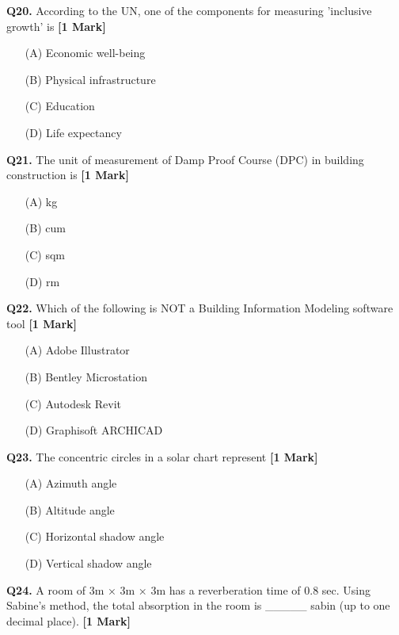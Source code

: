 \documentclass[11pt]{article}
\newcommand{\questiona}[2]{
    \noindent\textbf{Q#2.} #1 \hfill \textbf{[1 Mark]}
}
\begin{document}
\questiona{According to the UN, one of the components for measuring 'inclusive growth' is}{20}
\begin{enumerate}
    \item[(A)] Economic well-being  
    \item[(B)] Physical infrastructure  
    \item[(C)] Education  
    \item[(D)] Life expectancy  
\end{enumerate}
\vspace{0.5cm}

\questiona{The unit of measurement of Damp Proof Course (DPC) in building construction is}{21}
\begin{enumerate}
    \item[(A)] kg  
    \item[(B)] cum  
    \item[(C)] sqm  
    \item[(D)] rm  
\end{enumerate}
\vspace{0.5cm}

\questiona{Which of the following is NOT a Building Information Modeling software tool}{22}
\begin{enumerate}
    \item[(A)] Adobe Illustrator  
    \item[(B)] Bentley Microstation  
    \item[(C)] Autodesk Revit  
    \item[(D)] Graphisoft ARCHICAD  
\end{enumerate}
\vspace{0.5cm}

\questiona{The concentric circles in a solar chart represent}{23}
\begin{enumerate}
    \item[(A)] Azimuth angle  
    \item[(B)] Altitude angle  
    \item[(C)] Horizontal shadow angle  
    \item[(D)] Vertical shadow angle  
\end{enumerate}
\vspace{0.5cm}

\questiona{A room of 3m × 3m × 3m has a reverberation time of 0.8 sec. Using Sabine's method, the total absorption in the room is \_\_\_\_\_ sabin (up to one decimal place).}{24}
\vspace{0.5cm}
\end{document}
